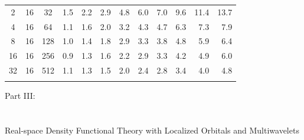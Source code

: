 \documentclass[mathserif, 10pt]{beamer}
\begin{document}
\begin{frame}
\begin{table}
\begin{tabular}{cccrrrrrrrrr}
	  2& 16& 32	&  1.5 	&  2.2 	&  2.9 	&  4.8  &  6.0  &  7.0  &  9.6  & 11.4  & 13.7  \\
	  4& 16& 64	&  1.1 	&  1.6 	&  2.0 	&  3.2  &  4.3  &  4.7  &  6.3  &  7.3  &  7.9  \\
	  8& 16&128	&  1.0 	&  1.4 	&  1.8 	&  2.9  &  3.3  &  3.8  &  4.8  &  5.9  &  6.4  \\
	 16& 16&256	&  0.9 	&  1.3 	&  1.6 	&  2.2  &  2.9  &  3.3  &  4.2  &  4.9  &  6.0  \\
	 32& 16&512	&  1.1 	&  1.3 	&  1.5 	&  2.0  &  2.4  &  2.8  &  3.4  &  4.0  &  4.8  \\
	   &   &   	&      	&      	&      	&    	&    	&	&	&	&	\\
	\hline                                                                           
	\hline
    \end{tabular}
    \end{table}
\end{frame}

\begin{frame}
    \centering
    \Large{Part III:}\\
    \ \\
    \ \\
    \centering
    \Large{Real-space Density Functional Theory with Localized Orbitals and Multiwavelets}
\end{frame}
\end{document}
